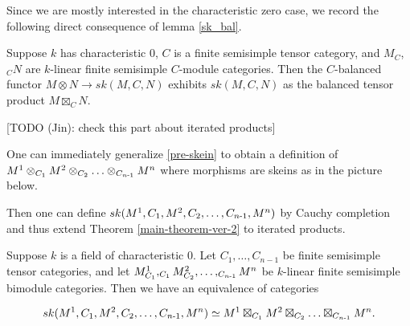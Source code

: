 \noindent Since we are mostly interested in the characteristic zero case, we record the
following direct consequence of lemma \ref{sk_bal}.

\begin{theorem} \label{main-theorem-ver-2}
   Suppose $k$ has characteristic $0$, $C$ is a finite semisimple tensor
   category, and $M_C$,$_{C}N$ are $k$-linear finite semisimple $C$-module
   categories. Then the $C$-balanced functor $M\otimes N\to sk(M,C,N)$
   exhibits $sk(M,C,N)$ as the balanced tensor product $M\boxtimes_C
   N$.
\end{theorem}

[TODO (Jin): check this part about iterated products]

% 
% 
% 

\begin{remark}
One can immediately generalize \ref{pre-skein} to obtain a definition of $M^{1} \otimes_{C_{1}} M^{2} \otimes_{C_{2}} \ldots \otimes_{C_{n{\text -}1}} M^{n}$ where morphisms are skeins as in the picture below. \begin{center}\end{center}

Then one can define $sk(M^{1}, C_{1}, M^{2}, C_{2}, \ldots, C_{n{\text -} 1}, M^{n})$ by Cauchy completion and thus extend Theorem \ref{main-theorem-ver-2} to iterated products.

\end{remark}


\begin{corollary}\label{iterated}
  Suppose $k$ is a field of characteristic $0$. Let $C_{1}, \ldots,
  C_{n-1}$ be finite semisimple tensor categories, and let $M^{1}_{C_{1}},
  _{C_{1}}M^{2}_{C_{2}}, \ldots, _{C_{n{\text -}1}}M^{n}$ be
  $k$-linear finite semisimple bimodule categories. Then we have an equivalence
  of categories

  \[
    sk(M^{1}, C_{1}, M^{2}, C_{2}, \ldots, C_{n{\text -} 1}, M^{n})
    \simeq
    M^{1} \boxtimes_{C_{1}} M^{2} \boxtimes_{C_{2}} \ldots \boxtimes_{C_{n{\text -}1}} M^{n}.
  \]
\end{corollary}

